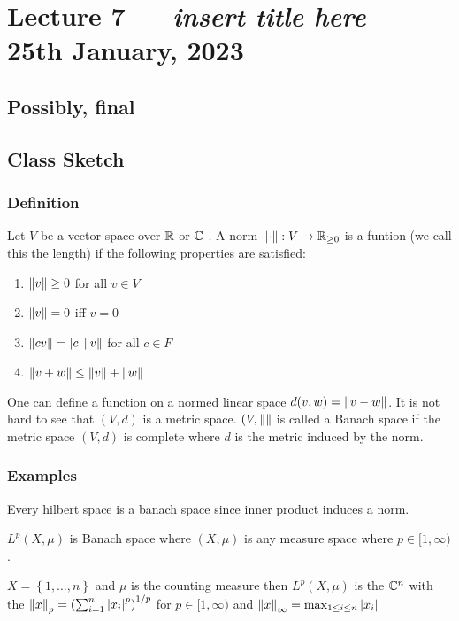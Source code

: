 \section{Lecture 7 --- \textit{insert title here} --- 25th January, 2023}
\horz
\subsection{Possibly, final}

\horz

\subsection{Class Sketch}
\horz

\subsubsection{Definition}
Let $V$ be a vector space over $\mathbb R$ or $\mathbb C$ . A norm $\left\lVert  \cdot  \right\rVert : V \to \mathbb R _{\ge 0}$ is a funtion (we call this the length) if the following properties are satisfied:
\begin{enumerate}
    \item $\left\lVert v \right\rVert \ge 0$ for all $v\in V$
    \item $\left\lVert v \right\rVert = 0$ iff $v=0$
    \item $\left\lVert cv \right\rVert = \left\lvert c \right\rvert\left\lVert v \right\rVert$ for all $c\in F$
    \item $\left\lVert v+w \right\rVert \le \left\lVert v \right\rVert + \left\lVert w \right\rVert$
\end{enumerate}

One can define a function on a normed linear space $d(v,w) = \left\lVert v-w \right\rVert$. It is not hard to see that $(V,d)$ is a metric space. $(V, \left\lVert  \right\rVert$ is called a Banach space if the metric space $(V,d)$ is complete where $d$ is the metric induced by the norm.
    

    \subsubsection{Examples}
    Every hilbert space is a banach space since inner product induces a norm.


    $L^{p} \left( X,\mu \right)$ is Banach space where $(X, \mu)$ is any measure space where $p\in [1,\infty)$.

    $X= \left\{ 1,\ldots , n \right\}$ and $\mu$ is the counting measure then $L^{p} \left( X, \mu \right)$ is the $\mathbb C ^{n}$ with the $\left\lVert x \right\rVert_{p} = \left( \sum_{i=1} ^{n} \left\lvert x_{i} \right\rvert^{p} \right) ^{1/p}$ for $p\in [1, \infty)$ and $\left\lVert x \right\rVert_{\infty} = \max_{1\le i \le n} \left\lvert x_{i} \right\rvert$


